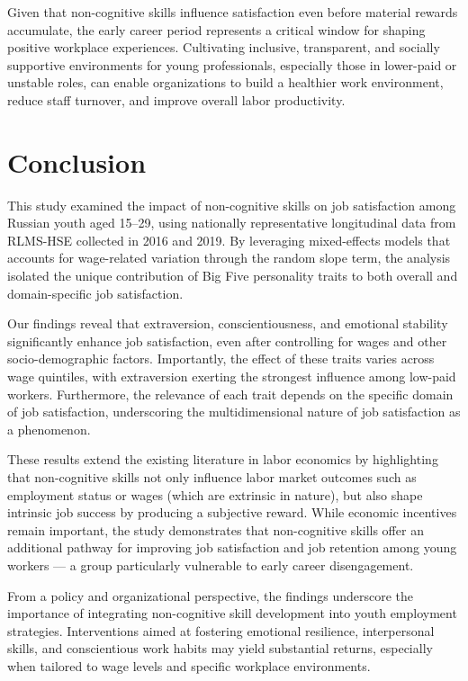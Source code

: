 \documentclass[
]{interact}
\begin{document}
Given that non-cognitive skills influence satisfaction even before
material rewards accumulate, the early career period represents a
critical window for shaping positive workplace experiences. Cultivating
inclusive, transparent, and socially supportive environments for young
professionals, especially those in lower-paid or unstable roles, can
enable organizations to build a healthier work environment, reduce staff
turnover, and improve overall labor productivity.

\section{Conclusion}\label{conclusion}

This study examined the impact of non-cognitive skills on job
satisfaction among Russian youth aged 15--29, using nationally
representative longitudinal data from RLMS-HSE collected in 2016 and
2019. By leveraging mixed-effects models that accounts for wage-related
variation through the random slope term, the analysis isolated the
unique contribution of Big Five personality traits to both overall and
domain-specific job satisfaction.

Our findings reveal that extraversion, conscientiousness, and emotional
stability significantly enhance job satisfaction, even after controlling
for wages and other socio-demographic factors. Importantly, the effect
of these traits varies across wage quintiles, with extraversion exerting
the strongest influence among low-paid workers. Furthermore, the
relevance of each trait depends on the specific domain of job
satisfaction, underscoring the multidimensional nature of job
satisfaction as a phenomenon.

These results extend the existing literature in labor economics by
highlighting that non-cognitive skills not only influence labor market
outcomes such as employment status or wages (which are extrinsic in
nature), but also shape intrinsic job success by producing a subjective
reward. While economic incentives remain important, the study
demonstrates that non-cognitive skills offer an additional pathway for
improving job satisfaction and job retention among young workers --- a
group particularly vulnerable to early career disengagement.

From a policy and organizational perspective, the findings underscore
the importance of integrating non-cognitive skill development into youth
employment strategies. Interventions aimed at fostering emotional
resilience, interpersonal skills, and conscientious work habits may
yield substantial returns, especially when tailored to wage levels and
specific workplace environments.
\end{document}
